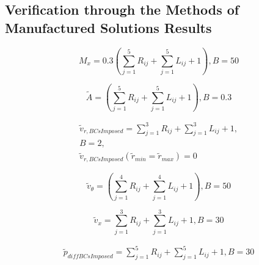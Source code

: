 

\subsection{Verification through the Methods of Manufactured Solutions Results} 

\begin{equation}
    M_x = 0.3 \left(
    \sum_{j=1}^5 R_{ij} +
    \sum_{j=1}^5 L_{ij} + 1
    \right) , B = 50
    \label{eqn:MMS_M_x}
\end{equation}

\begin{equation}
    \tilde{A} = \left(
    \sum_{j=1}^5 R_{ij} +
    \sum_{j=1}^5 L_{ij} + 1
    \right) , B = 0.3
    \label{eqn:MMS_A}
\end{equation}

\begin{align}
    \tilde{v}_{r,BCsImposed} = 
    \sum_{j=1}^3 R_{ij} +
    \sum_{j=1}^3 L_{ij} + 1, \\
    B = 2 , \\ 
    \tilde{v}_{r,BCsImposed}(\tilde{r}_{min}=\tilde{r}_{max}) = 0
    \label{eqn:MMS_vTh}
\end{align}

\begin{equation}
    \tilde{v}_{\theta} = \left(
    \sum_{j=1}^4 R_{ij} +
    \sum_{j=1}^4 L_{ij} + 1
    \right) , B = 50 
    \label{eqn:MMS_vTh}
\end{equation}

\begin{equation}
    \tilde{v}_{x} = 
    \sum_{j=1}^3 R_{ij} +
    \sum_{j=1}^3 L_{ij} + 1
    , B = 30 
    \label{eqn:MMS_vX}
\end{equation}

\begin{align}
    \tilde{p}_{diffBCsImposed} = 
    \sum_{j=1}^5 R_{ij} +
    \sum_{j=1}^5 L_{ij} + 1
    , B = 30 
    \label{eqn:MMS_p}
\end{align}

